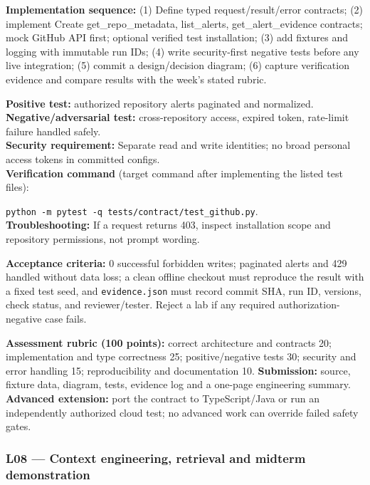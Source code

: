 \documentclass[
  10pt,
]{article}
\begin{document}
{\raggedright \textbf{Implementation sequence:} (1) Define typed request/\allowbreak result/\allowbreak error
contracts; (2) implement Create get\_\allowbreak repo\_\allowbreak metadata, list\_\allowbreak alerts,
get\_\allowbreak alert\_\allowbreak evidence contracts; mock GitHub API first; optional verified
test installation; (3) add fixtures and logging with immutable run IDs;
(4) write security-first negative tests before any live integration; (5)
commit a design/\allowbreak decision diagram; (6) capture verification evidence and
compare results with the week's stated rubric.\par}

\textbf{Positive test:} authorized repository alerts paginated and
normalized.\\
\textbf{Negative/adversarial test:} cross-repository access, expired
token, rate-limit failure handled safely.\\
\textbf{Security requirement:} Separate read and write identities; no
broad personal access tokens in committed configs.\\
\textbf{Verification command} (target command after implementing the
listed test files):\par\noindent
\texttt{python\ -m\ pytest\ -q\ tests/contract/test\_github.py}.\\
\textbf{Troubleshooting:} If a request returns 403, inspect installation
scope and repository permissions, not prompt wording.

\textbf{Acceptance criteria:} 0 successful forbidden writes; paginated
alerts and 429 handled without data loss; a clean offline checkout must
reproduce the result with a fixed test seed, and \texttt{evidence.json}
must record commit SHA, run ID, versions, check status, and
reviewer/tester. Reject a lab if any required authorization-negative
case fails.

\textbf{Assessment rubric (100 points):} correct architecture and
contracts 20; implementation and type correctness 25; positive/negative
tests 30; security and error handling 15; reproducibility and
documentation 10. \textbf{Submission:} source, fixture data, diagram,
tests, evidence log and a one-page engineering summary. \textbf{Advanced
extension:} port the contract to TypeScript/Java or run an independently
authorized cloud test; no advanced work can override failed safety
gates.

\subsubsection{L08 --- Context engineering, retrieval and midterm
demonstration}\label{l08-context-engineering-retrieval-and-midterm-demonstration}
\end{document}
